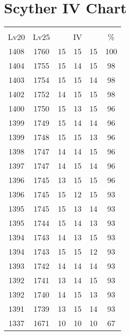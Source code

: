\documentclass{article}%
\begin{document}
%
\normalsize%
\section{Scyther IV Chart}%
\label{sec:Scyther IV Chart}%
\renewcommand{\arraystretch}{1.5}%
\begin{tabular}{|c|c|c|c|c|c|}%
\hline%
\multicolumn{6}{|c|}{\textcolor{white}{ 
\linebreak{Scyther}
}%
\cellcolor{black}}\\%
\multicolumn{1}{|c}{Lv20}&\multicolumn{1}{c|}{Lv25}&\multicolumn{3}{c|}{IV}&\multicolumn{1}{|c|}{\%}\\%
\hline%
\rowcolor{color100}%
1408&1760&15&15&15&100\\%
\hline%
\rowcolor{color98}%
1404&1755&15&14&15&98\\%
\hline%
\rowcolor{color98}%
1403&1754&15&15&14&98\\%
\hline%
\rowcolor{color98}%
1402&1752&14&15&15&98\\%
\hline%
\rowcolor{color96}%
1400&1750&15&13&15&96\\%
\hline%
\rowcolor{color96}%
1399&1749&15&14&14&96\\%
\hline%
\rowcolor{color96}%
1399&1748&15&15&13&96\\%
\hline%
\rowcolor{color96}%
1398&1747&14&14&15&96\\%
\hline%
\rowcolor{color96}%
1397&1747&14&15&14&96\\%
\hline%
\rowcolor{color96}%
1396&1745&13&15&15&96\\%
\hline%
\rowcolor{color93}%
1396&1745&15&12&15&93\\%
\hline%
\rowcolor{color93}%
1395&1745&15&13&14&93\\%
\hline%
\rowcolor{color93}%
1395&1744&15&14&13&93\\%
\hline%
\rowcolor{color93}%
1394&1743&14&13&15&93\\%
\hline%
\rowcolor{color93}%
1394&1743&15&15&12&93\\%
\hline%
\rowcolor{color93}%
1393&1742&14&14&14&93\\%
\hline%
\rowcolor{color93}%
1392&1741&13&14&15&93\\%
\hline%
\rowcolor{color93}%
1392&1740&14&15&13&93\\%
\hline%
\rowcolor{color93}%
1391&1739&13&15&14&93\\%
\hline%
\rowcolor{color91}%
1337&1671&10&10&10&67\\%
\end{tabular}

%
\end{document}
